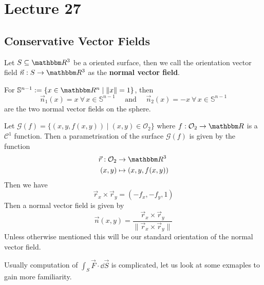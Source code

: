 \documentclass[Analysis-3]{subfiles}
\begin{document}
\chapter*{Lecture 27} %
\setcounter{chapter}{27} %
\setcounter{section}{0}

\section{Conservative Vector Fields}

Let $S \subseteq \R^3$ be a oriented surface, then we call the orientation vector field $\vec{n} : S \to \R^3$ as the \textbf{normal vector field}. 

\begin{Eg}{}{}
    For $\mathbb{S}^{n-1} := \{ x \in \R^n \mid \| x \| = 1 \}$, then 
    \[
        \vec{n}_1(x) = x \ \forall \, x \in \mathbb{S}^{n-1} \quad \mbox{ and } \quad \vec{n}_2(x) = -x \ \forall \, x \in \mathbb{S}^{n-1}
    \]
    are the two normal vector fields on the sphere. 
\end{Eg}

\begin{Eg}{}{}
    Let $\mathcal{G}(f) = \{ (x,y,f(x,y)) \mid (x,y) \in \mathcal{O}_2\}$ where $f : \mathcal{O}_2 \to \R$ is a $\mathscr{C}^1$ function. Then a parametrisation of the surface $\mathcal{G}(f)$ is given by the function 
    \begin{align*}
        \vec{r} : \mathcal{O}_2 &\to \R^3 \\ 
        (x,y) &\mapsto (x,y,f(x,y))
    \end{align*}
    Then we have 
    \[
        \vec{r}_x \times \vec{r}_y = (-f_x, -f_y, 1)    
    \]
    Then a normal vector field is given by 
    \[
        \vec{n}(x,y) = \frac{\vec{r}_x \times \vec{r}_y}{\|\vec{r}_x \times \vec{r}_y \|}    
    \]
    Unless otherwise mentioned this will be our standard orientation of the normal vector field. 
\end{Eg}

Usually computation of $\int_S \vec{F} \cdot \dd \vec{S}$ is complicated, let us look at some exmaples to gain more familiarity. 
\end{document}
